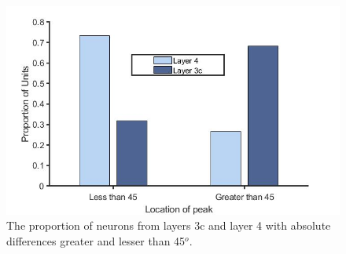 	\begin{figure}[H]
		
		\includegraphics[width=\linewidth]{ShrewV1/cmlayer.jpg}
		\caption{The proportion of neurons from layers 3c and layer 4 with absolute differences greater and lesser than 45$^o$.}
		\label{fig:cmlayer}
	\end{figure}

